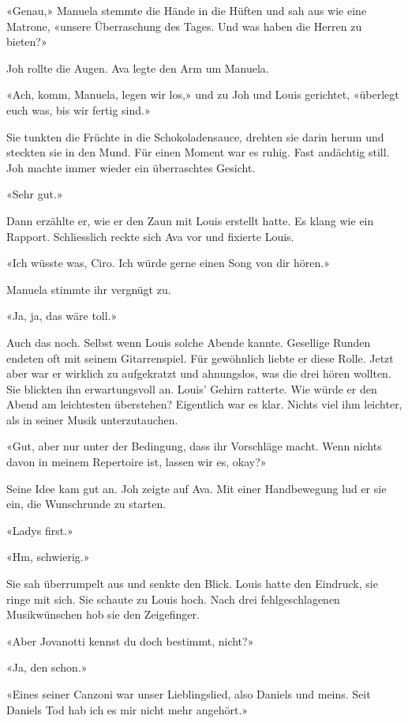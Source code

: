 «Genau,» Manuela stemmte die Hände in die Hüften und sah aus wie eine
Matrone, «unsere Überraschung des Tages. Und was haben die Herren zu
bieten?»

Joh rollte die Augen.
Ava legte den Arm um Manuela.

«Ach, komm, Manuela, legen wir los,» und zu Joh und Louis gerichtet,
«überlegt euch was, bis wir fertig sind.»

Sie tunkten die Früchte in die Schokoladensauce, drehten sie darin herum
und steckten sie in den Mund. Für einen Moment war es ruhig. Fast
andächtig still.
Joh machte immer wieder ein überraschtes Gesicht.

«Sehr gut.»

Dann erzählte er, wie er den Zaun mit Louis erstellt hatte. Es klang
wie ein Rapport.
Schliesslich reckte sich Ava vor und fixierte Louis.

«Ich wüsste was, Ciro. Ich würde gerne einen Song von dir hören.»

Manuela stimmte ihr vergnügt zu.

«Ja, ja, das wäre toll.»

Auch das noch. Selbst wenn Louis solche Abende
kannte. Gesellige Runden endeten oft mit seinem Gitarrenspiel. Für
gewöhnlich liebte er diese Rolle. Jetzt aber war er wirklich zu aufgekratzt und
ahnungslos, was die drei hören wollten. Sie blickten ihn erwartungsvoll
an. Louis’ Gehirn ratterte. Wie würde er den Abend am leichtesten
überstehen? Eigentlich war es klar. Nichts viel ihm leichter, als in
seiner Musik unterzutauchen.

«Gut, aber nur unter der Bedingung, dass ihr Vorschläge macht. Wenn
nichts davon in meinem Repertoire ist, lassen wir es, okay?»

Seine Idee kam gut an.
Joh zeigte auf Ava. Mit einer Handbewegung lud er sie ein, die Wunschrunde
zu starten.

«Ladys first.»

«Hm, schwierig.»

Sie sah überrumpelt aus und senkte den Blick. Louis hatte den Eindruck,
sie ringe mit sich. Sie schaute zu Louis hoch. Nach drei
fehlgeschlagenen Musikwünschen hob sie den Zeigefinger.

«Aber Jovanotti kennst du doch bestimmt, nicht?»

«Ja, den schon.»

«Eines seiner Canzoni war unser Lieblingslied, also Daniels und meins. Seit Daniels Tod hab ich es mir nicht mehr angehört.»

